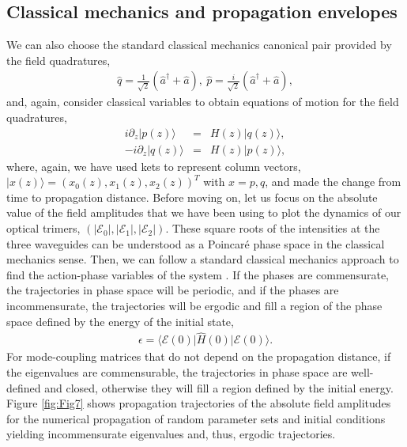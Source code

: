 \documentclass[9pt,twocolumn,twoside]{osajnl}
\begin{document}
\subsection{Classical mechanics and propagation envelopes }
We can also choose the standard classical mechanics canonical pair  provided by the field quadratures, 
\begin{eqnarray}
	\hat{q} = \frac{1}{\sqrt{2}} \left( \hat{a}^{\dagger} + \hat{a} \right), ~ 
	\hat{p} = \frac{i}{\sqrt{2}} \left( \hat{a}^{\dagger} + \hat{a} \right),
\end{eqnarray}
and, again, consider classical variables to obtain equations of motion for the field quadratures,
\begin{eqnarray}
	i \partial_z \vert p(z) \rangle	
	 &=&
	H(z) \vert q(z) \rangle , \\
-	i \partial_z \vert q(z) \rangle	 &=& 
    H(z)	\vert p(z) \rangle,
\end{eqnarray}
where, again, we have used kets to represent column vectors, $\vert x(z) \rangle = \left( x_{0}(z), x_{1}(z), x_{2}(z) \right)^{T}$ with $x=p,q$, and made the change from time to propagation distance.
Before moving on, let us focus on the absolute value of the field amplitudes that we have been using to plot the dynamics of our optical trimers, $(\vert \mathcal{E}_{0} \vert,\vert \mathcal{E}_{1} \vert,\vert \mathcal{E}_{2} \vert )$.
These square roots of the intensities at the three waveguides can be understood as a Poincar\'e phase space in the classical mechanics sense.
Then, we can follow a standard classical mechanics approach to find the action-phase variables of the system \cite{Goldstein1980}. 
If the phases are commensurate, the trajectories in phase space will be periodic, and if the phases are incommensurate, the trajectories will be ergodic and fill a region of the phase space defined by the energy of the initial state,
\begin{eqnarray}
\epsilon = \langle \mathcal{E}(0) \vert \hat{H}(0) \vert \mathcal{E}(0) \rangle.
\end{eqnarray}  
For mode-coupling matrices that do not depend on the propagation distance, if the eigenvalues are commensurable, the trajectories in phase space are well-defined and closed, otherwise they will fill a region defined by the initial energy.
Figure \ref{fig:Fig7} shows propagation trajectories of the absolute field amplitudes for the numerical propagation of random parameter sets and initial conditions yielding incommensurate eigenvalues and, thus, ergodic trajectories.
\end{document}
